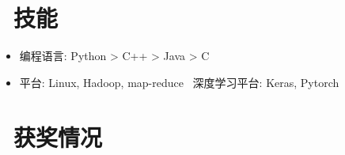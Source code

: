 \documentclass{resume}
\begin{document}
\section{\faCogs\ 技能}
\begin{itemize}[parsep=0.5ex]
  \item 编程语言: Python > C++ > Java > C
  \item 平台: Linux, Hadoop, map-reduce \ 深度学习平台: Keras, Pytorch
\end{itemize}

\section{\faHeartO\ 获奖情况}
%
%
\end{document}
